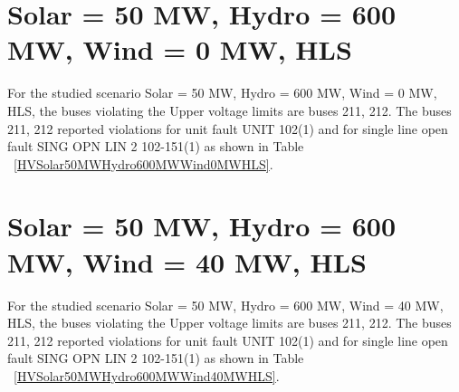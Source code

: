 \documentclass[10pt]{report}
\begin{document}
\section{Solar = 50 MW, Hydro = 600 MW, Wind = 0 MW, HLS}
For the studied scenario Solar = 50 MW, Hydro = 600 MW, Wind = 0 MW, HLS, the buses violating the Upper voltage limits are buses 211, 212.
The buses 211, 212 reported violations for unit fault UNIT 102(1) and for single line open fault SING OPN LIN   2 102-151(1) as shown in Table ~\ref{HVSolar50MWHydro600MWWind0MWHLS}.
\begin{table}[H]
\caption{Contingencies reporting bus voltages greater than emergency voltage of 1.1 PU for scenario Solar = 50 MW, Hydro = 600 MW, Wind = 0 MW, HLS}
\label{HVSolar50MWHydro600MWWind0MWHLS}
\centering
{}
\end{table}

\section{Solar = 50 MW, Hydro = 600 MW, Wind = 40 MW, HLS}
For the studied scenario Solar = 50 MW, Hydro = 600 MW, Wind = 40 MW, HLS, the buses violating the Upper voltage limits are buses 211, 212.
The buses 211, 212 reported violations for unit fault UNIT 102(1) and for single line open fault SING OPN LIN   2 102-151(1) as shown in Table ~\ref{HVSolar50MWHydro600MWWind40MWHLS}.
\begin{table}[H]
\caption{Contingencies reporting bus voltages greater than emergency voltage of 1.1 PU for scenario Solar = 50 MW, Hydro = 600 MW, Wind = 40 MW, HLS}
\label{HVSolar50MWHydro600MWWind40MWHLS}
\centering
{}
\end{table}
\end{document}
